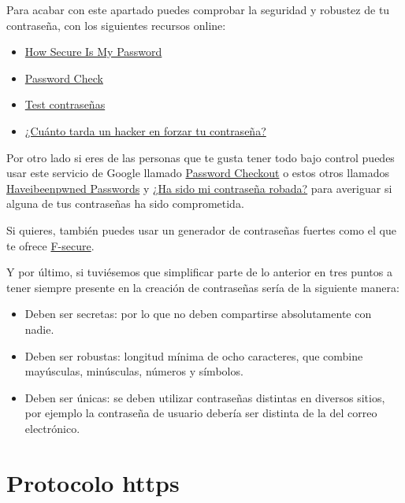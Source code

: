 \documentclass[
  spanish,
  a4paper,
  openany]{book}
\begin{document}
Para acabar con este apartado puedes comprobar la seguridad y robustez de tu contraseña, con los siguientes recursos online:

\begin{itemize}
\item
  \href{https://howsecureismypassword.net/}{How Secure Is My Password}
\item
  \href{https://password.kaspersky.com/}{Password Check}
\item
  \href{https://www.ontek.net/test-contrasenas/}{Test contraseñas}
\item
  \href{https://www.hivesystems.io/blog/are-your-passwords-in-the-green}{¿Cuánto tarda un hacker en forzar tu contraseña?}
\end{itemize}

Por otro lado si eres de las personas que te gusta tener todo bajo control puedes usar este servicio de Google llamado \href{https://www.blog.google/technology/safety-security/google-password-checkup-cross-account-protection/}{Password Checkout} o estos otros llamados \href{https://haveibeenpwned.com/Passwords}{Haveibeenpwned Passwords} y \href{https://www.avast.com/hackcheck}{¿Ha sido mi contraseña robada?} para averiguar si alguna de tus contraseñas ha sido comprometida.

Si quieres, también puedes usar un generador de contraseñas fuertes como el que te ofrece \href{https://www.f-secure.com/en/home/free-tools/password-generator}{F-secure}.

Y por último, si tuviésemos que simplificar parte de lo anterior en tres puntos a tener siempre presente en la creación de contraseñas sería de la siguiente manera:

\begin{itemize}
\item
  Deben ser secretas: por lo que no deben compartirse absolutamente con nadie.
\item
  Deben ser robustas: longitud mínima de ocho caracteres, que combine mayúsculas, minúsculas, números y símbolos.
\item
  Deben ser únicas: se deben utilizar contraseñas distintas en diversos sitios, por ejemplo la contraseña de usuario debería ser distinta de la del correo electrónico.
\end{itemize}

\hypertarget{protocolo-https}{%
\section{Protocolo https}\label{protocolo-https}}
\end{document}
